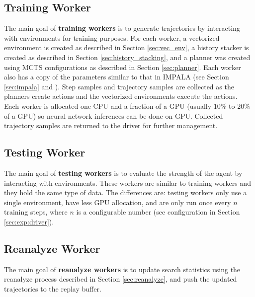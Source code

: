 \subsection{Training Worker} \label{sec:train_rw}
The main goal of \textbf{training workers} is to generate trajectories by interacting with environments for training purposes.
For each worker, a vectorized environment is created as described in Section \ref{sec:vec_env}, a history stacker is created as described in Section \ref{sec:history_stacking}, and a planner was created using MCTS configurations as described in Section \ref{sec:planner}.
Each worker also has a copy of the parameters similar to that in IMPALA (see Section \ref{sec:impala} and \cite{IMPALAScalableDistributed_Espeholt.Soyer.ea_2018}).
Step samples and trajectory samples are collected as the planners create actions and the vectorized environments execute the actions.
Each worker is allocated one CPU and a fraction of a GPU (usually $10\% $ to $20\%$ of a GPU) so neural network inferences can be done on GPU.
Collected trajectory samples are returned to the driver for further management.

\subsection{Testing Worker} \label{sec:test_rw}
The main goal of \textbf{testing workers} is to evaluate the strength of the agent by interacting with environments.
These workers are similar to training workers and they hold the same type of data.
The differences are: testing workers only use a single environment, have less GPU allocation, and are only run once every $n$ training steps, where $n$ is a configurable number (see configuration in Section \ref{sec:exp:driver}).

\subsection{Reanalyze Worker} \label{sec:re_w}
The main goal of \textbf{reanalyze workers} is to update search statistics using the reanalyze process described in Section \ref{sec:reanalyze}, and push the updated trajectories to the replay buffer.

